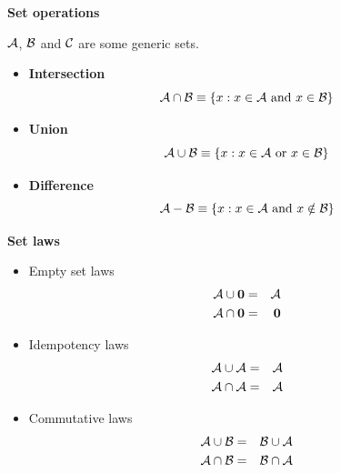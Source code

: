 \documentclass[justified, sixbynine]{tufte-book}
\def\subsubsection#1{{\bf #1}}
\theoremstyle{plain}%
\newtheorem * {corollary}{Corollary}
\theoremstyle{definition}
\theoremstyle{remark}
\newtheorem * {remark}{Remark}
\newtheorem * {note}{Note}
\begin{document}
\begin{fullwidth}
\subsubsection{Set operations}

${\cal A}$, ${\cal B}$ and ${\cal C}$ are some generic sets.

\begin{itemize}
\item  {\bf Intersection}
\begin{equation}
{\cal A}\cap {\cal B}\equiv \{x:x\in {\cal A}\text{ and }x\in
{\cal B}\}
\end{equation}

\item  {\bf Union}
\begin{equation}
{\cal A}\cup {\cal B}\equiv \{x:x\in {\cal A}\text{ or }x\in {\cal %
B}\}
\end{equation}

\item  {\bf Difference}
\begin{equation}
{\cal A}-{\cal B}\equiv \{x:x\in {\cal A}\text{ and }x\notin {\cal %
B}\}
\end{equation}
\end{itemize}

\subsubsection{Set laws}

\begin{itemize}
\item  Empty set laws
\begin{eqnarray}
{\cal A}\cup {\bf 0} &=&{\cal A} \\
{\cal A}\cap {\bf 0} &=&{\bf 0}
\end{eqnarray}

\item  Idempotency laws
\begin{eqnarray}
{\cal A}\cup {\cal A} &=&{\cal A} \\
{\cal A}\cap {\cal A} &=&{\cal A}
\end{eqnarray}

\item  Commutative laws
\begin{eqnarray}
{\cal A}\cup {\cal B} &=&{\cal B}\cup {\cal A} \\
{\cal A}\cap {\cal B} &=&{\cal B}\cap {\cal A}
\end{eqnarray}


\end{itemize}
\end{fullwidth}
\end{document}
